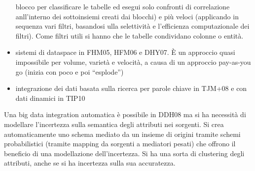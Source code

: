 \documentclass[a4paper,12pt, oneside]{book}
\begin{document}
\begin{itemize}
  blocco per classificare le tabelle ed esegui solo confronti di correlazione
  anll'interno dei sottoinsiemi creati dai blocchi) e
  più veloci (applicando in 
  sequenza vari filtri, basandosi ulla selettività e l'efficienza computazionale
  dei filtri). Come filtri utili si hanno che le tabelle condividano colonne o
  entità. 
  \item sistemi di dataspace in FHM05, HFM06 e DHY07. È un approccio quasi
  impossibile per volume, varietà e velocità, a causa di un approccio pay-as-you
  go (inizia con poco e poi ``esplode'')
  \item integrazione dei dati basata sulla ricerca per parole chiave in TJM+08
  e con dati dinamici in TIP10
\end{itemize}
Una big data integration automatica è possibile in DDH08 ma si ha necessità di
modellare l'incertezza sulla semantica degli attributi nei sorgenti. Si crea
automaticamente uno schema mediato da un insieme di origini tramite schemi
probabilistici (tramite mapping da sorgenti a mediatori pesati) che offrono il
beneficio di una modellazione dell'incertezza. Si ha una sorta di clustering
degli attributi, anche se si ha incertezza sulla sua accuratezza. \\
\end{document}
